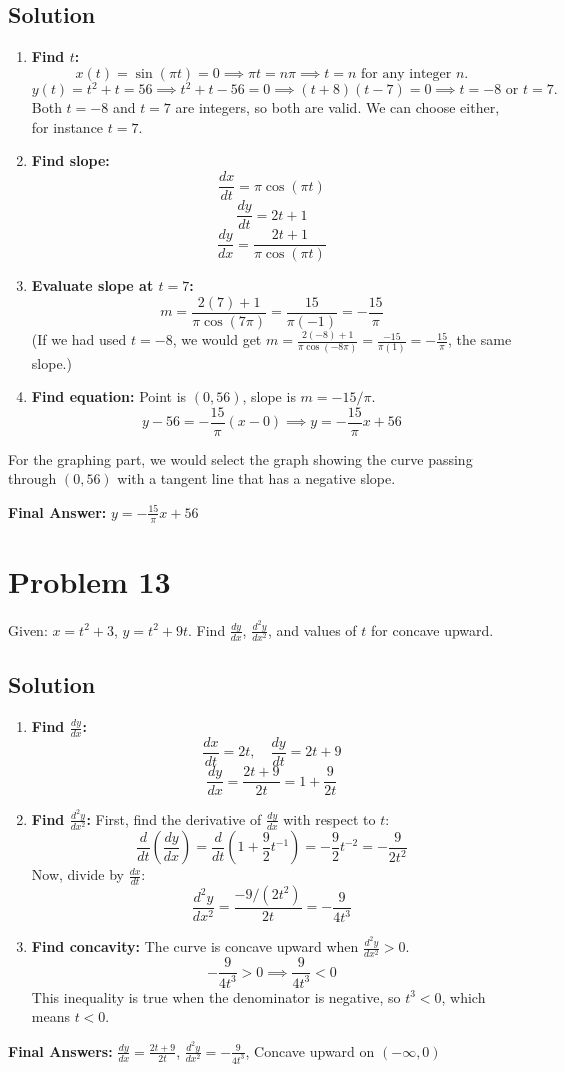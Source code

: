 \documentclass{article}
\begin{document}
\subsection*{Solution}
\begin{enumerate}
    \item \textbf{Find $t$:}
    \[ x(t) = \sin(\pi t) = 0 \implies \pi t = n\pi \implies t = n \text{ for any integer } n. \]
    \[ y(t) = t^2 + t = 56 \implies t^2 + t - 56 = 0 \implies (t+8)(t-7) = 0 \implies t=-8 \text{ or } t=7. \]
    Both $t=-8$ and $t=7$ are integers, so both are valid. We can choose either, for instance $t=7$.
    \item \textbf{Find slope:}
    \[ \frac{dx}{dt} = \pi \cos(\pi t) \]
    \[ \frac{dy}{dt} = 2t + 1 \]
    \[ \frac{dy}{dx} = \frac{2t+1}{\pi\cos(\pi t)} \]
    \item \textbf{Evaluate slope at $t=7$:}
    \[ m = \frac{2(7)+1}{\pi\cos(7\pi)} = \frac{15}{\pi(-1)} = -\frac{15}{\pi} \]
    (If we had used $t=-8$, we would get $m = \frac{2(-8)+1}{\pi\cos(-8\pi)} = \frac{-15}{\pi(1)} = -\frac{15}{\pi}$, the same slope.)
    \item \textbf{Find equation:} Point is $(0,56)$, slope is $m=-15/\pi$.
    \[ y - 56 = -\frac{15}{\pi}(x - 0) \implies y = -\frac{15}{\pi}x + 56 \]
\end{enumerate}
For the graphing part, we would select the graph showing the curve passing through $(0,56)$ with a tangent line that has a negative slope.

\textbf{Final Answer:} $y = -\frac{15}{\pi}x + 56$

\section{Problem 13}
Given: $x = t^2 + 3$, $y = t^2 + 9t$. Find $\frac{dy}{dx}$, $\frac{d^2y}{dx^2}$, and values of $t$ for concave upward.

\subsection*{Solution}
\begin{enumerate}
    \item \textbf{Find $\frac{dy}{dx}$:}
    \[ \frac{dx}{dt} = 2t, \quad \frac{dy}{dt} = 2t + 9 \]
    \[ \frac{dy}{dx} = \frac{2t+9}{2t} = 1 + \frac{9}{2t} \]
    \item \textbf{Find $\frac{d^2y}{dx^2}$:}
    First, find the derivative of $\frac{dy}{dx}$ with respect to $t$:
    \[ \frac{d}{dt}\left(\frac{dy}{dx}\right) = \frac{d}{dt}\left(1 + \frac{9}{2}t^{-1}\right) = -\frac{9}{2}t^{-2} = -\frac{9}{2t^2} \]
    Now, divide by $\frac{dx}{dt}$:
    \[ \frac{d^2y}{dx^2} = \frac{-9/(2t^2)}{2t} = -\frac{9}{4t^3} \]
    \item \textbf{Find concavity:} The curve is concave upward when $\frac{d^2y}{dx^2} > 0$.
    \[ -\frac{9}{4t^3} > 0 \implies \frac{9}{4t^3} < 0 \]
    This inequality is true when the denominator is negative, so $t^3 < 0$, which means $t < 0$.
\end{enumerate}
\textbf{Final Answers:}
$\frac{dy}{dx} = \frac{2t+9}{2t}$,
$\frac{d^2y}{dx^2} = -\frac{9}{4t^3}$,
Concave upward on $(-\infty, 0)$
\end{document}
